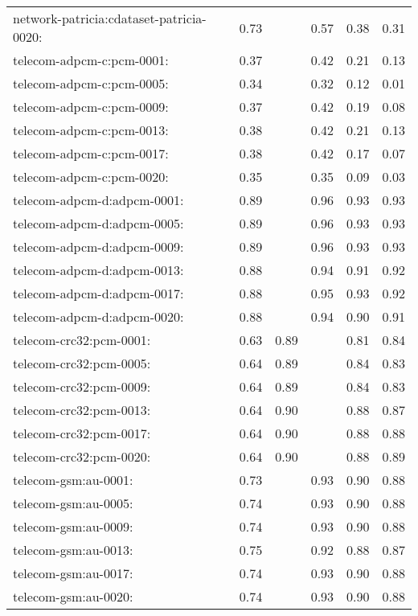 \begin{longtable}{lrrrrr}
network-patricia:cdataset-patricia-0020: & 0.73 & \color{Green}{0.75} & 0.57 & 0.38 & 0.31 \\
telecom-adpcm-c:pcm-0001: & 0.37 & \color{Green}{0.63} & 0.42 & 0.21 & 0.13 \\
telecom-adpcm-c:pcm-0005: & 0.34 & \color{Green}{0.57} & 0.32 & 0.12 & 0.01 \\
telecom-adpcm-c:pcm-0009: & 0.37 & \color{Green}{0.63} & 0.42 & 0.19 & 0.08 \\
telecom-adpcm-c:pcm-0013: & 0.38 & \color{Green}{0.64} & 0.42 & 0.21 & 0.13 \\
telecom-adpcm-c:pcm-0017: & 0.38 & \color{Green}{0.63} & 0.42 & 0.17 & 0.07 \\
telecom-adpcm-c:pcm-0020: & 0.35 & \color{Green}{0.59} & 0.35 & 0.09 & 0.03 \\
telecom-adpcm-d:adpcm-0001: & 0.89 & \color{Green}{0.97} & 0.96 & 0.93 & 0.93 \\
telecom-adpcm-d:adpcm-0005: & 0.89 & \color{Green}{0.97} & 0.96 & 0.93 & 0.93 \\
telecom-adpcm-d:adpcm-0009: & 0.89 & \color{Green}{0.97} & 0.96 & 0.93 & 0.93 \\
telecom-adpcm-d:adpcm-0013: & 0.88 & \color{Green}{0.96} & 0.94 & 0.91 & 0.92 \\
telecom-adpcm-d:adpcm-0017: & 0.88 & \color{Green}{0.97} & 0.95 & 0.93 & 0.92 \\
telecom-adpcm-d:adpcm-0020: & 0.88 & \color{Green}{0.96} & 0.94 & 0.90 & 0.91 \\
telecom-crc32:pcm-0001: & 0.63 & 0.89 & \color{Green}{0.91} & 0.81 & 0.84 \\
telecom-crc32:pcm-0005: & 0.64 & 0.89 & \color{Green}{0.90} & 0.84 & 0.83 \\
telecom-crc32:pcm-0009: & 0.64 & 0.89 & \color{Green}{0.92} & 0.84 & 0.83 \\
telecom-crc32:pcm-0013: & 0.64 & 0.90 & \color{Green}{0.93} & 0.88 & 0.87 \\
telecom-crc32:pcm-0017: & 0.64 & 0.90 & \color{Green}{0.94} & 0.88 & 0.88 \\
telecom-crc32:pcm-0020: & 0.64 & 0.90 & \color{Green}{0.94} & 0.88 & 0.89 \\
telecom-gsm:au-0001: & 0.73 & \color{Green}{0.94} & 0.93 & 0.90 & 0.88 \\
telecom-gsm:au-0005: & 0.74 & \color{Green}{0.94} & 0.93 & 0.90 & 0.88 \\
telecom-gsm:au-0009: & 0.74 & \color{Green}{0.94} & 0.93 & 0.90 & 0.88 \\
telecom-gsm:au-0013: & 0.75 & \color{Green}{0.94} & 0.92 & 0.88 & 0.87 \\
telecom-gsm:au-0017: & 0.74 & \color{Green}{0.94} & 0.93 & 0.90 & 0.88 \\
telecom-gsm:au-0020: & 0.74 & \color{Green}{0.94} & 0.93 & 0.90 & 0.88 \\
\end{longtable}
